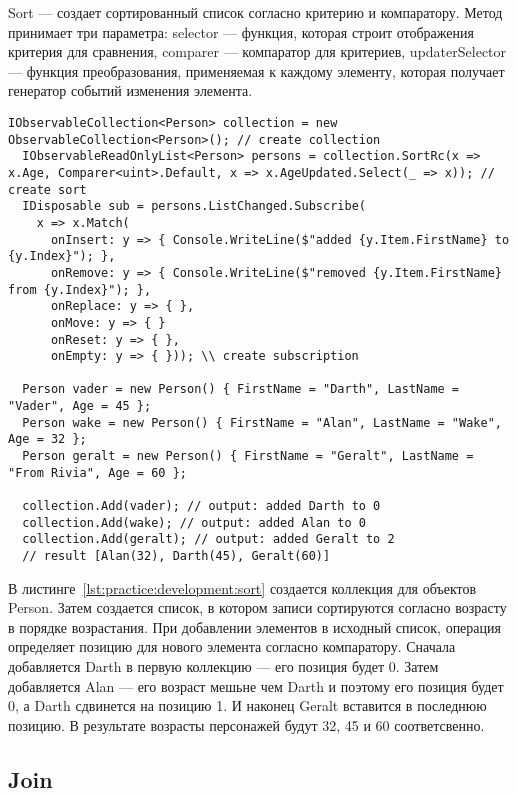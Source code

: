 Sort --- создает сортированный список согласно критерию и компаратору.
Метод принимает три параметра: selector --- функция, которая строит отображения критерия для сравнения, comparer --- компаратор для критериев,
updaterSelector --- функция преобразования, применяемая к каждому элементу, которая получает генератор событий изменения элемента.

\begin{lstlisting}[style=csharpinlinestyle, caption={Пример использования Sort}, label=lst:practice:development:sort]
  IObservableCollection<Person> collection = new ObservableCollection<Person>(); // create collection
  IObservableReadOnlyList<Person> persons = collection.SortRc(x => x.Age, Comparer<uint>.Default, x => x.AgeUpdated.Select(_ => x)); // create sort
  IDisposable sub = persons.ListChanged.Subscribe(
    x => x.Match(
      onInsert: y => { Console.WriteLine($"added {y.Item.FirstName} to {y.Index}"); },
      onRemove: y => { Console.WriteLine($"removed {y.Item.FirstName} from {y.Index}"); },
      onReplace: y => { },
      onMove: y => { }
      onReset: y => { },
      onEmpty: y => { })); \\ create subscription

  Person vader = new Person() { FirstName = "Darth", LastName = "Vader", Age = 45 };
  Person wake = new Person() { FirstName = "Alan", LastName = "Wake", Age = 32 };
  Person geralt = new Person() { FirstName = "Geralt", LastName = "From Rivia", Age = 60 };

  collection.Add(vader); // output: added Darth to 0
  collection.Add(wake); // output: added Alan to 0
  collection.Add(geralt); // output: added Geralt to 2
  // result [Alan(32), Darth(45), Geralt(60)]
\end{lstlisting}

В листинге~\ref{lst:practice:development:sort} создается коллекция для объектов Person. Затем создается список, в котором записи сортируются согласно возрасту в порядке возрастания.
При добавлении элементов в исходный список, операция определяет позицию для нового элемента согласно компаратору.
Сначала добавляется Darth в первую коллекцию --- его позиция будет 0. Затем добавляется Alan --- его возраст мешьне чем Darth и поэтому его позиция будет 0, а Darth сдвинется на позицию 1.
И наконец Geralt вставится в последнюю позицию. В результате возрасты персонажей будут 32, 45 и 60 соответсвенно.

\subsection{Join}
\label{sub:development:join}

